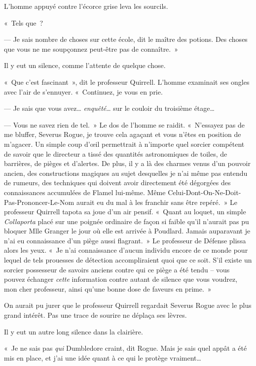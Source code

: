 L'homme appuyé contre l'écorce grise leva les sourcils.

«~Tels que~?

--- Je sais nombre de choses sur cette école, dit le maître des potions.
Des choses que vous ne me soupçonnez peut-être pas de connaître.~»

Il y eut un silence, comme l'attente de quelque chose.

«~Que c'est fascinant~», dit le professeur Quirrell.
L'homme examinait ses ongles avec l'air de s'ennuyer.
«~Continuez, je vous en prie.

--- Je sais que vous avez…
\emph{enquêté}… sur le couloir du troisième étage…

--- Vous ne savez rien de tel.~»
Le dos de l'homme se raidit.
«~N'essayez pas de me bluffer, Severus Rogue, je trouve cela agaçant et vous n'êtes en position de m'agacer.
Un simple coup d'œil permettrait à n'importe quel sorcier compétent de savoir que le directeur a tissé des quantités astronomiques de toiles, de barrières, de pièges et d'alertes.
De plus, il y a là des charmes venus d'un pouvoir ancien, des constructions magiques au sujet desquelles je n'ai même pas entendu de rumeurs, des techniques qui doivent avoir directement été dégorgées des connaissances accumulées de Flamel lui-même.
Même Celui-Dont-On-Ne-Doit-Pas-Prononcer-Le-Nom aurait eu du mal à les franchir sans être repéré.~»
Le professeur Quirrell tapota sa joue d'un air pensif.
«~Quant au loquet, un simple \emph{Collaporta} placé sur une poignée ordinaire de façon si faible qu'il n'aurait pas pu bloquer Mlle Granger le jour où elle est arrivée à Poudlard.
Jamais auparavant je n'ai eu connaissance d'un piège aussi flagrant.~»
Le professeur de Défense plissa alors les yeux.
«~Je n'ai connaissance d'aucun individu encore de ce monde pour lequel de tels prouesses de détection accompliraient quoi que ce soit.
S'il existe un sorcier possesseur de savoirs anciens contre qui ce piège a été tendu -- vous pouvez échanger \emph{cette} information contre autant de silence que vous voudrez, mon cher professeur, ainsi qu'une bonne dose de faveurs en prime.~»

On aurait pu jurer que le professeur Quirrell regardait Severus Rogue avec le plus grand intérêt.
Pas une trace de sourire ne déplaça ses lèvres.

Il y eut un autre long silence dans la clairière.

«~Je ne sais pas \emph{qui} Dumbledore craint, dit Rogue.
Mais je sais quel appât a été mis en place, et j'ai une idée quant à ce qui le protège vraiment…

